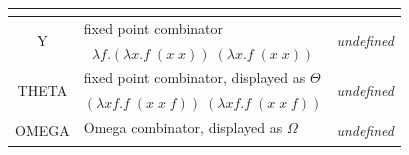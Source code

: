 \documentclass[table, a4paper, 10pt]{article}
\begin{document}
\begin{table}[H]
\begin{tabular}{cclcl}
\multicolumn{1}{|c|}{}                        & \multicolumn{2}{c|}{}                                                                                                                       & \multicolumn{1}{c|}{}                   & \multicolumn{1}{l|}{}                                                                                                                                             \\ \hline
\multicolumn{1}{|c|}{\multirow{2}{*}{Y}}      & \multicolumn{2}{l|}{fixed point combinator}                                                                                                 & \multicolumn{2}{c|}{\multirow{2}{*}{\textit{undefined}}}                                                                                                                                                    \\ \cline{2-3}
\multicolumn{1}{|c|}{}                        & \multicolumn{2}{c|}{$\lambda f.(\lambda x.f\;(x\;x))\;(\lambda x.f\;(x\;x))$}                                                               & \multicolumn{2}{c|}{}                                                                                                                                                                                       \\ \hline
\multicolumn{1}{|c|}{\multirow{2}{*}{THETA}}  & \multicolumn{2}{l|}{fixed point combinator, displayed  as $\Theta$}                                                                         & \multicolumn{2}{c|}{\multirow{2}{*}{\textit{undefined}}}                                                                                                                                                    \\ \cline{2-3}
\multicolumn{1}{|c|}{}                        & \multicolumn{2}{c|}{$(\lambda xf.f\;(x\;x\;f))\;(\lambda xf.f\;(x\;x\;f))$}                                                                 & \multicolumn{2}{c|}{}                                                                                                                                                                                       \\ \hline
\multicolumn{1}{|c|}{\multirow{2}{*}{OMEGA}}  & \multicolumn{2}{l|}{Omega combinator, displayed as $\Omega$}                                                                                & \multicolumn{2}{c|}{\multirow{2}{*}{\textit{undefined}}}                                                                                                                                                    \\ \cline{2-3}

\end{tabular}
\end{table}
\end{document}
